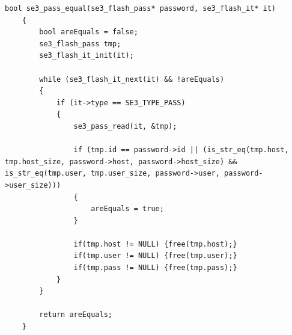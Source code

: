 \begin{lstlisting}[style=CStyle,caption="Code for searching if password record is already present", label=code_sepass_equal,breaklines=true]
	bool se3_pass_equal(se3_flash_pass* password, se3_flash_it* it)
	{
		bool areEquals = false;
		se3_flash_pass tmp;
		se3_flash_it_init(it);
		
		while (se3_flash_it_next(it) && !areEquals)
		{
			if (it->type == SE3_TYPE_PASS)
			{
				se3_pass_read(it, &tmp);
				
				if (tmp.id == password->id || (is_str_eq(tmp.host, tmp.host_size, password->host, password->host_size) && is_str_eq(tmp.user, tmp.user_size, password->user, password->user_size)))
				{
					areEquals = true;
				}
				
				if(tmp.host != NULL) {free(tmp.host);}
				if(tmp.user != NULL) {free(tmp.user);}
				if(tmp.pass != NULL) {free(tmp.pass);}
			}
		}
		
		return areEquals;
	}
\end{lstlisting}



